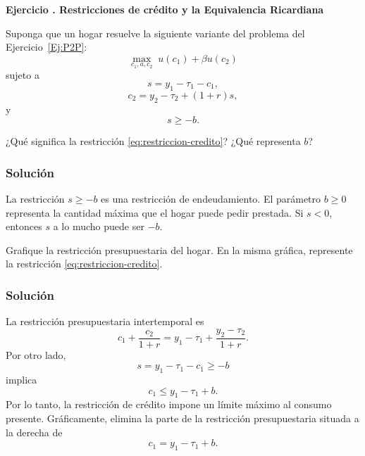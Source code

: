 \documentclass[11pt]{article}
\let\enumerateoriginal\enumerate
\let\endenumerateoriginal\endenumerate
\renewenvironment{enumerate}{%
  \enumerateoriginal
  \setlength{\itemsep}{0.5em}%
  \setlength{\parsep}{0pt}%
  \setlength{\topsep}{0.4em}%
}{\endenumerateoriginal}
\newcounter{problema}
\newenvironment{problema}[1]{%
  \par
  \refstepcounter{problema}%
  \addvspace{0.9em}%
  \noindent\textbf{Ejercicio \theproblema. #1}
  \par\nobreak\smallskip
}{\par}
\begin{document}
\begin{problema}{Restricciones de crédito y la Equivalencia Ricardiana}

Suponga que un hogar resuelve la siguiente variante del problema del
Ejercicio~\ref{Ej:P2P}:
\[
    \max_{c_1,a,c_2}\;u(c_1)+\beta u(c_2)
\]
sujeto a
\[
    s=y_1-\tau_1-c_1,
\]
\[
    c_2=y_2-\tau_2+(1+r)s,
\]
y
\begin{equation}
    s\geq-b.
    \label{eq:restriccion-credito}
\end{equation}

\begin{enumerate}

\item ¿Qué significa la restricción \eqref{eq:restriccion-credito}? ¿Qué representa \(b\)?

\subsubsection*{Solución}

La restricción $s\geq-b$ es una restricción de endeudamiento. El parámetro \(b\geq0\) representa la cantidad máxima que el hogar puede pedir prestada. Si $s<0$, entonces $s$ a lo mucho puede ser $-b$.

\item Grafique la restricción presupuestaria del hogar. En la misma gráfica, represente la restricción \eqref{eq:restriccion-credito}.

\subsubsection*{Solución}

La restricción presupuestaria intertemporal es
\[
  c_1+\frac{c_2}{1+r}
  =
  y_1-\tau_1+\frac{y_2-\tau_2}{1+r}.
\]
Por otro lado,
\[
  s=y_1-\tau_1-c_1\geq-b
\]
implica
\[
  c_1\leq y_1-\tau_1+b.
\]
Por lo tanto, la restricción de crédito impone un límite máximo al consumo presente. Gráficamente, elimina la parte de la restricción presupuestaria situada a la derecha de
\[
  c_1=y_1-\tau_1+b.
\]

\begin{figure}[htbp]
\centering
{}
\end{figure}
\end{enumerate}
\end{problema}
\end{document}
